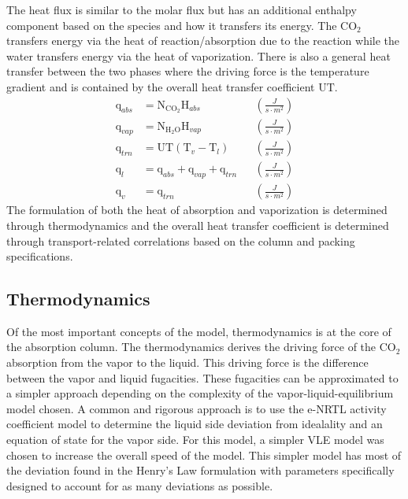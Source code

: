 \documentclass[12pt, letterpaper]{article}
\begin{document}
                The heat flux is similar to the molar flux but has an additional enthalpy component based on the species and
                how it transfers its energy.
                The $\mathrm{CO}_2$ transfers energy via the heat of reaction/absorption due to the reaction while the water transfers energy via the heat of vaporization.
                There is also a general heat transfer between the two phases where the driving force is the temperature gradient and is contained by the overall heat transfer coefficient $\mathrm{UT}$.
                \begin{align}
                    \mathrm{q}_{abs} &= \mathrm{N}_{\mathrm{CO}_2}\mathrm{H}_{abs} && \left(\frac{\unit{J}}{\unit{s\cdot m^2}} \right)\\
                    \mathrm{q}_{vap} &= \mathrm{N}_{\mathrm{H_{2}O}}\mathrm{H}_{vap} && \left(\frac{\unit{J}}{\unit{s\cdot m^2}} \right) \\
                    \mathrm{q}_{trn} &= \mathrm{U T}\left(\mathrm{T}_v-\mathrm{T}_l\right) && \left(\frac{\unit{J}}{\unit{s\cdot m^2}} \right)\\
                    \mathrm{q}_l &= \mathrm{q}_{abs} + \mathrm{q}_{vap} + \mathrm{q}_{trn} && \left(\frac{\unit{J}}{\unit{s\cdot m^2}} \right)\\
                    \mathrm{q}_v &= \mathrm{q}_{trn} && \left(\frac{\unit{J}}{\unit{s\cdot m^2}} \right)
                \end{align}
                The formulation of both the heat of absorption and vaporization is determined through thermodynamics and the overall heat transfer coefficient is determined through transport-related correlations based on the column and packing specifications.
                
        \subsection{Thermodynamics}\label{subsec:thermodynamics}
            Of the most important concepts of the model, thermodynamics is at the core of the absorption column.
            The thermodynamics derives the driving force of the $\mathrm{CO}_2$ absorption from the vapor to the liquid.
            This driving force is the difference between the vapor and liquid fugacities.
            These fugacities can be approximated to a simpler approach depending on the complexity of the vapor-liquid-equilibrium model chosen.
            A common and rigorous approach is to use the e-NRTL activity coefficient model to determine the liquid side deviation from idealality and an equation of state for the vapor side.
            For this model, a simpler VLE model was chosen to increase the overall speed of the model.
            This simpler model has most of the deviation found in the Henry's Law formulation with parameters specifically designed to account for as many deviations as possible.
    
\end{document}
